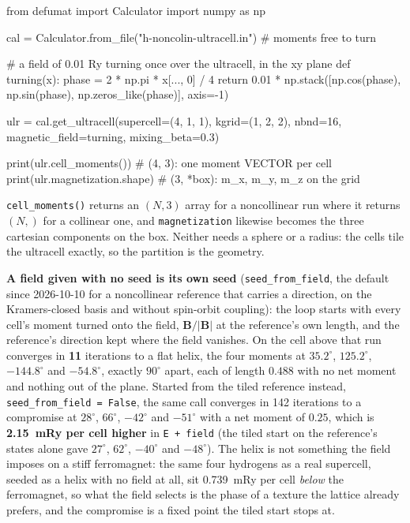 \documentclass[11pt,a4paper]{article}
\newcommand{\code}[1]{\texttt{\small #1}}
\begin{document}
\begin{pycode}
from defumat import Calculator
import numpy as np

cal = Calculator.from_file("h-noncolin-ultracell.in")  # moments free to turn

# a field of 0.01 Ry turning once over the ultracell, in the xy plane
def turning(x):
    phase = 2 * np.pi * x[..., 0] / 4
    return 0.01 * np.stack([np.cos(phase), np.sin(phase),
                            np.zeros_like(phase)], axis=-1)

ulr = cal.get_ultracell(supercell=(4, 1, 1), kgrid=(1, 2, 2), nbnd=16,
                        magnetic_field=turning, mixing_beta=0.3)

print(ulr.cell_moments())         # (4, 3): one moment VECTOR per cell
print(ulr.magnetization.shape)    # (3, *box): m_x, m_y, m_z on the grid
\end{pycode}

\code{cell\_moments()} returns an $(N,3)$ array for a noncollinear run where it
returns $(N,)$ for a collinear one, and \code{magnetization} likewise becomes the
three cartesian components on the box. Neither needs a sphere or a radius: the
cells tile the ultracell exactly, so the partition is the geometry.

\textbf{A field given with no seed is its own seed} (\code{seed\_from\_field},
the default since 2026-10-10 for a noncollinear reference that carries a
direction, on the Kramers-closed basis and without spin-orbit coupling): the loop starts with every cell's
moment turned onto the field, $\mathbf B/|\mathbf B|$ at the reference's own
length, and the reference's direction kept where the field vanishes. On the cell
above that run converges in \textbf{11} iterations to a flat helix, the four
moments at $35.2^\circ$, $125.2^\circ$, $-144.8^\circ$ and $-54.8^\circ$, exactly
$90^\circ$ apart, each of length $0.488$ with no net moment and nothing out of
the plane. Started from the tiled reference instead, \code{seed\_from\_field =
False}, the same call converges in 142 iterations to a compromise at $28^\circ$,
$66^\circ$, $-42^\circ$ and $-51^\circ$ with a net moment of $0.25$, which is
\textbf{2.15~mRy per cell higher} in \code{E + field} (the tiled start on the
reference's states alone gave $27^\circ$, $62^\circ$, $-40^\circ$ and $-48^\circ$).
The helix is not something the field imposes on a stiff ferromagnet: the same
four hydrogens as a real supercell, seeded as a helix with no field at all, sit
0.739~mRy per cell \emph{below} the ferromagnet, so what the field selects is the
phase of a texture the lattice already prefers, and the compromise is a fixed
point the tiled start stops at.
\end{document}
